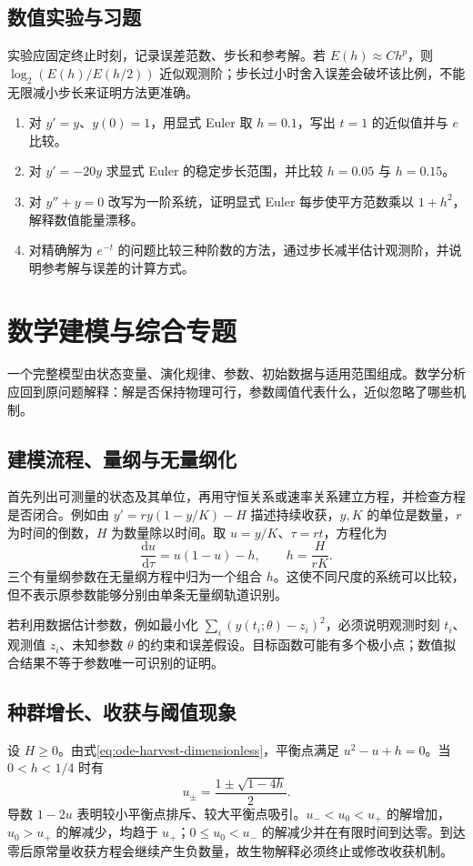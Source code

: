 \documentclass[UTF8,12pt,a4paper,fontset=fandol]{ctexbook}
\begin{document}
\section{数值实验与习题}
实验应固定终止时刻，记录误差范数、步长和参考解。若 $E(h)\approx Ch^p$，则 $\log_2(E(h)/E(h/2))$ 近似观测阶；步长过小时舍入误差会破坏该比例，不能无限减小步长来证明方法更准确。
\begin{enumerate}
 \item\label{ex:ode-euler-value} 对 $y'=y$、$y(0)=1$，用显式 Euler 取 $h=0.1$，写出 $t=1$ 的近似值并与 $e$ 比较。
 \item\label{ex:ode-euler-stability} 对 $y'=-20y$ 求显式 Euler 的稳定步长范围，并比较 $h=0.05$ 与 $h=0.15$。
 \item 对 $y''+y=0$ 改写为一阶系统，证明显式 Euler 每步使平方范数乘以 $1+h^2$，解释数值能量漂移。
 \item 对精确解为 $e^{-t}$ 的问题比较三种阶数的方法，通过步长减半估计观测阶，并说明参考解与误差的计算方式。
\end{enumerate}

\chapter{数学建模与综合专题}
\label{chap:ode-modeling}

一个完整模型由状态变量、演化规律、参数、初始数据与适用范围组成。数学分析应回到原问题解释：解是否保持物理可行，参数阈值代表什么，近似忽略了哪些机制。

\section{建模流程、量纲与无量纲化}
首先列出可测量的状态及其单位，再用守恒关系或速率关系建立方程，并检查方程是否闭合。例如由 $y'=ry(1-y/K)-H$ 描述持续收获，$y,K$ 的单位是数量，$r$ 为时间的倒数，$H$ 为数量除以时间。取 $u=y/K$、$\tau=rt$，方程化为
\begin{equation}
 \frac{\mathrm du}{\mathrm d\tau}=u(1-u)-h,\qquad h=\frac{H}{rK}.
 \label{eq:ode-harvest-dimensionless}
\end{equation}
三个有量纲参数在无量纲方程中归为一个组合 $h$。这使不同尺度的系统可以比较，但不表示原参数能够分别由单条无量纲轨道识别。

若利用数据估计参数，例如最小化 $\sum_i(y(t_i;\theta)-z_i)^2$，必须说明观测时刻 $t_i$、观测值 $z_i$、未知参数 $\theta$ 的约束和误差假设。目标函数可能有多个极小点；数值拟合结果不等于参数唯一可识别的证明。

\section{种群增长、收获与阈值现象}
设 $H\geq0$。由式\eqref{eq:ode-harvest-dimensionless}，平衡点满足 $u^2-u+h=0$。当 $0<h<1/4$ 时有
\[
 u_\pm=\frac{1\pm\sqrt{1-4h}}2.
\]
导数 $1-2u$ 表明较小平衡点排斥、较大平衡点吸引。$u_-<u_0<u_+$ 的解增加，$u_0>u_+$ 的解减少，均趋于 $u_+$；$0\leq u_0<u_-$ 的解减少并在有限时间到达零。到达零后原常量收获方程会继续产生负数量，故生物解释必须终止或修改收获机制。
\end{document}
